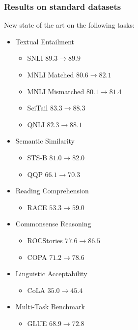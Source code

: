\documentclass[9pt]{beamer}
\begin{document}
\begin{frame}

  \frametitle{Results on standard datasets}

  New state of the art on the following tasks:

  \bigskip

  \begin{itemize}
  \item Textual Entailment
    \begin{itemize}
      \footnotesize
    \item SNLI $89.3 \rightarrow 89.9$
    \item MNLI Matched $80.6 \rightarrow 82.1$
    \item MNLI Mismatched $80.1 \rightarrow 81.4$
    \item SciTail $83.3 \rightarrow 88.3$
    \item QNLI $82.3 \rightarrow 88.1 $
    \end{itemize}
    \smallskip
  \item Semantic Similarity
    \begin{itemize}
      \footnotesize
    \item STS-B $81.0 \rightarrow 82.0$
    \item QQP $66.1 \rightarrow 70.3$
    \end{itemize}
    \smallskip
  \item Reading Comprehension
    \begin{itemize}
      \footnotesize
    \item RACE $53.3 \rightarrow 59.0$
    \end{itemize}
    \smallskip
  \item Commonsense Reasoning
    \begin{itemize}
      \footnotesize
    \item ROCStories $77.6 \rightarrow 86.5$
    \item COPA $71.2 \rightarrow 78.6$
    \end{itemize}
    \smallskip
  \item Linguistic Acceptability
    \begin{itemize}
      \footnotesize
      \item CoLA $35.0 \rightarrow 45.4$
    \end{itemize}
    \smallskip
  \item Multi-Task Benchmark
    \begin{itemize}
      \footnotesize
      \item GLUE $68.9 \rightarrow 72.8$
    \end{itemize}
  \end{itemize}

\end{frame}
\end{document}

